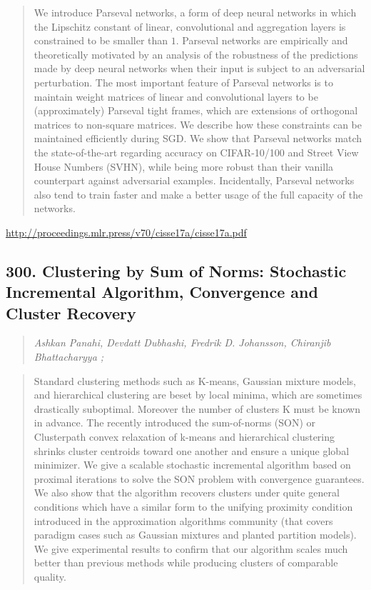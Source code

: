 \documentclass{article}
\begin{document}
\begin{quote}
    We introduce Parseval networks, a form of deep neural networks in which the Lipschitz constant of linear, convolutional and aggregation layers is constrained to be smaller than $1$. Parseval networks are empirically and theoretically motivated by an analysis of the robustness of the predictions made by deep neural networks when their input is subject to an adversarial perturbation. The most important feature of Parseval networks is to maintain weight matrices of linear and convolutional layers to be (approximately) Parseval tight frames, which are extensions of orthogonal matrices to non-square matrices. We describe how these constraints can be maintained efficiently during SGD. We show that Parseval networks match the state-of-the-art regarding accuracy on CIFAR-10/100 and Street View House Numbers (SVHN), while being more robust than their vanilla counterpart against adversarial examples. Incidentally, Parseval networks also tend to train faster and make a better usage of the full capacity of the networks.  \end{quote}

\href{http://proceedings.mlr.press/v70/cisse17a/cisse17a.pdf}{http://proceedings.mlr.press/v70/cisse17a/cisse17a.pdf}

\subsection{300. Clustering by Sum of Norms: Stochastic Incremental Algorithm, Convergence and Cluster Recovery}

\begin{quote}
\footnotesize{\textit{Ashkan Panahi, Devdatt Dubhashi, Fredrik D. Johansson, Chiranjib Bhattacharyya ;}}
\end{quote}

\begin{quote}
    Standard clustering methods such as K-means, Gaussian mixture models, and hierarchical clustering are beset by local minima, which are sometimes drastically suboptimal. Moreover the number of clusters K must be known in advance. The recently introduced the sum-of-norms (SON) or Clusterpath convex relaxation of k-means and hierarchical clustering shrinks cluster centroids toward one another and ensure a unique global minimizer. We give a scalable stochastic incremental algorithm based on proximal iterations to solve the SON problem with convergence guarantees. We also show that the algorithm recovers clusters under quite general conditions which have a similar form to the unifying proximity condition introduced in the approximation algorithms community (that covers paradigm cases such as Gaussian mixtures and planted partition models). We give experimental results to confirm that our algorithm scales much better than previous methods while producing clusters of comparable quality.  \end{quote}
\end{document}
